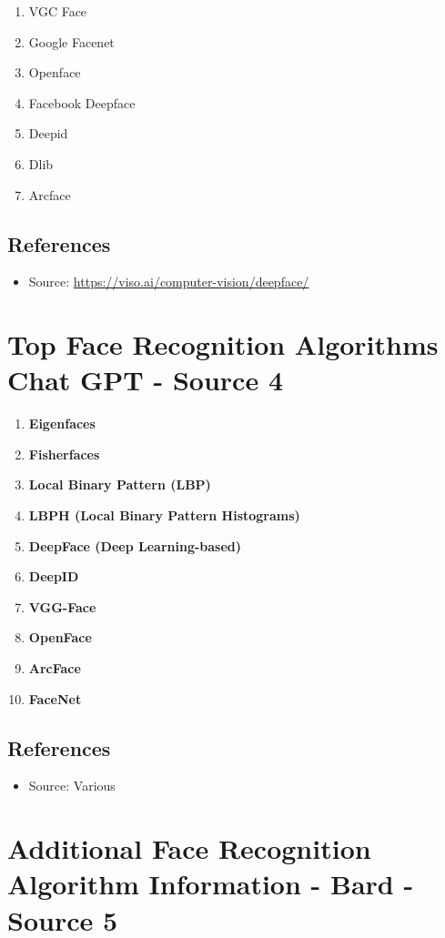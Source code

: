 \documentclass[11pt]{article}
\begin{document}
\begin{enumerate}
    \item VGC Face
    \item Google Facenet
    \item Openface
    \item Facebook Deepface
    \item Deepid
    \item Dlib
    \item Arcface
\end{enumerate}


\subsection{References}
\begin{itemize}
    \item Source: \url{https://viso.ai/computer-vision/deepface/}
\end{itemize}

\section{Top Face Recognition Algorithms Chat GPT - Source 4}
\begin{enumerate}
    \item \textbf{Eigenfaces}
    \item \textbf{Fisherfaces}
    \item \textbf{Local Binary Pattern (LBP)}
    \item \textbf{LBPH (Local Binary Pattern Histograms)}
    \item \textbf{DeepFace (Deep Learning-based)}
    \item \textbf{DeepID}
    \item \textbf{VGG-Face}
    \item \textbf{OpenFace}
    \item \textbf{ArcFace}
    \item \textbf{FaceNet}
\end{enumerate}

\subsection{References}
\begin{itemize}
    \item Source: Various
\end{itemize}


\section{Additional Face Recognition Algorithm Information - Bard - Source 5}
\end{document}
